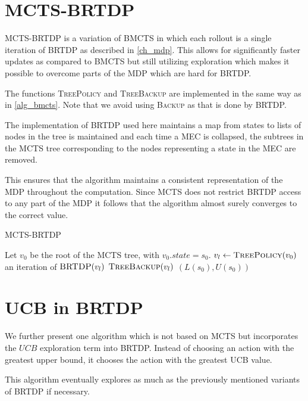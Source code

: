\section{MCTS-BRTDP}

MCTS-BRTDP is a variation of BMCTS in which each rollout is a
single iteration of BRTDP as described in \autoref{ch_mdp}. This allows
for significantly faster updates as compared to BMCTS but still
utilizing exploration which makes it possible to overcome parts of the
MDP which are hard for BRTDP.

The functions \textsc{TreePolicy} and \textsc{TreeBackup} are implemented in
the same way as in \autoref{alg_bmcts}. Note that we avoid using
\textsc{Backup} as that is done by BRTDP.

The implementation of BRTDP used here maintains a map from states to
lists of nodes in the tree is maintained and each time a MEC is
collapsed, the subtrees in the MCTS tree corresponding to the nodes
representing a state in the MEC are removed.

This ensures that the algorithm maintains a consistent representation of
the MDP throughout the computation. Since MCTS does not restrict BRTDP
access to any part of the MDP it follows that the algorithm almost
surely converges to the correct value.

\begin{algorithm}
\caption{MCTS-BRTDP}
\label{mcts-brtdp}
\begin{algorithmic}
    \State Let $v_0$ be the root of the MCTS tree, with $v_0.state = s_0$.
        \State $v_l \gets \Call{TreePolicy}{v_0}$
        \State an iteration of $\Call{BRTDP}{v_l}$
        \State $\Call{TreeBackup}{v_l}$
    \EndWhile
    \State \Return $(L(s_0), U(s_0))$
\EndFunction

\end{algorithmic}
\end{algorithm}

\section{UCB in BRTDP}

We further present one algorithm which is not based on MCTS but
incorporates the $UCB$ exploration term into BRTDP. Instead of choosing
an action with the greatest upper bound, it chooses the action with the
greatest UCB value.

This algorithm eventually explores as much as the previously mentioned
variants of BRTDP if necessary.
